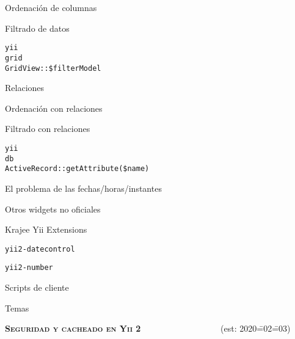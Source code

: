\begin{longenum}
\begin{longenum}
\begin{longenum}
\begin{longenum}
                \item Ordenación de columnas
                \item Filtrado de datos
                \begin{longenum}
                    \item \texttt{yii\\grid\\GridView::\$filterModel}
                \end{longenum}
                \item Relaciones
                \begin{longenum}
                    \item Ordenación con relaciones
                    \item Filtrado con relaciones
                    \begin{longenum}
                        \item \texttt{yii\\db\\ActiveRecord::getAttribute(\$name)}
                    \end{longenum}
                \end{longenum}
            \end{longenum}
            \item El problema de las fechas/horas/instantes
            \item Otros widgets no oficiales
            \begin{longenum}
                \item Krajee Yii Extensions
                \begin{longenum}
                    \item \texttt{yii2-datecontrol}
                    \item \texttt{yii2-number}
                \end{longenum}
            \end{longenum}
        \end{longenum}
        \item Scripts de cliente
        \item Temas \opcional\
    \end{longenum}
    \item \textbf{\textsc{Seguridad y cacheado en Yii 2}} \ \ \ \ \ \ \ \ \ \ \ \ \ \ \ \ \ \ (est: 2020\==02\==03)
    \begin{longenum}

\end{longenum}
\end{longenum}
